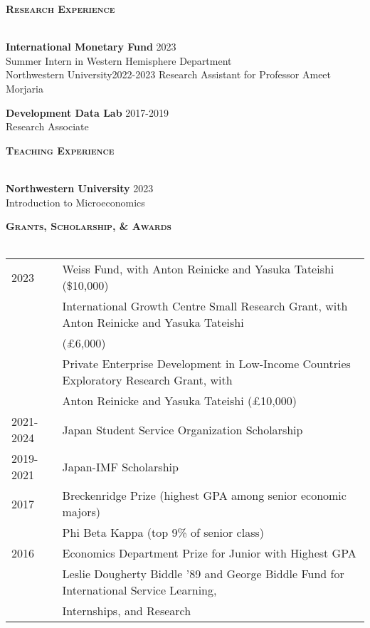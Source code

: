 \documentclass[11pt]{article}
\newcommand{\lineunder}{\vspace*{-8pt} \\ \hspace*{-18pt} \hrulefill \\}
\newcommand{\header}[1]{{\hspace*{-15pt}\vspace*{6pt} \textsc{#1}} \vspace*{-6pt} \lineunder}
\newcommand{\schoolwithcourses}[4]{
 \textbf{#1} \hfill{#2}\\
    #3\\
\vspace*{5pt}
}
\begin{document}

\header{\textbf{Research Experience}}
\vspace{2mm}
\schoolwithcourses{International Monetary Fund}{2023}{\hspace{2mm} Summer Intern in Western Hemisphere Department}

\schoolwithcourses{Northwestern University}{2022-2023}{\hspace{2mm} Research Assistant for Professor Ameet Morjaria}

\schoolwithcourses{Development Data Lab}{2017-2019}{\hspace{2mm} Research Associate}
\hfill{}
\vspace{3mm}


\header{\textbf{Teaching Experience}}
\vspace{2mm}
\schoolwithcourses{Northwestern University}{2023}{\hspace{2mm} Introduction to Microeconomics}
\hfill{}
\vspace{3mm}


\header{\textbf{Grants, Scholarship, \& Awards}}
\vspace{2mm}

\begin{tabular}{l @{\hspace{4.5ex}} l }
2023 & Weiss Fund, with Anton Reinicke and Yasuka Tateishi (\$10,000) \\
& International Growth Centre Small Research Grant, with Anton Reinicke and Yasuka Tateishi \\
& (£6,000) \\
& Private Enterprise Development in Low-Income Countries Exploratory Research Grant, with \\
 & Anton Reinicke and Yasuka Tateishi (£10,000) \\
2021-2024 & Japan Student Service Organization Scholarship \\
2019-2021 & Japan-IMF Scholarship \\
2017 & Breckenridge Prize (highest GPA among senior economic majors) \\
& Phi Beta Kappa (top 9\% of senior class) \\
2016 & Economics Department Prize for Junior with Highest GPA \\
& Leslie Dougherty Biddle '89 and George Biddle Fund for International Service Learning, \\
& Internships, and Research \\
\end{tabular}
\vspace{2mm}
\hfill{}
\end{document}
